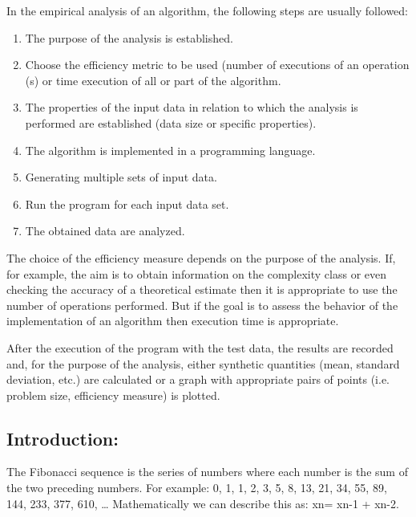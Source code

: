 \documentclass[12pt]{article}
\begin{document}
In the empirical analysis of an algorithm, the following steps are usually followed:

\begin{enumerate}[itemsep=1pt]
  \item The purpose of the analysis is established.  
  \item Choose the efficiency metric to be used (number of executions of an operation (s) or time 
execution of all or part of the algorithm.
  \item The properties of the input data in relation to which the analysis is performed are established 
(data size or specific properties).  
  \item The algorithm is implemented in a programming language.
  \item  Generating multiple sets of input data. 
  \item  Run the program for each input data set.  
  \item   The obtained data are analyzed.   
\end{enumerate}

The choice of the efficiency measure depends on the purpose of the analysis. If, for example, the 
aim is to obtain information on the complexity class or even checking the accuracy of a theoretical 
estimate then it is appropriate to use the number of operations performed. But if the goal is to assess the 
behavior of the implementation of an algorithm then execution time is appropriate. 

After the execution of the program with the test data, the results are recorded and, for the purpose 
of the analysis, either synthetic quantities (mean, standard deviation, etc.) are calculated or a graph with 
appropriate pairs of points (i.e. problem size, efficiency measure) is plotted.

\subsection*{Introduction:}
\hspace{0.8cm} The Fibonacci sequence is the series of numbers where each number is the sum of the two 
preceding numbers. For example: 0, 1, 1, 2, 3, 5, 8, 13, 21, 34, 55, 89, 144, 233, 377, 610, … 
Mathematically we can describe this as: xn= xn-1 + xn-2. 
\end{document}
